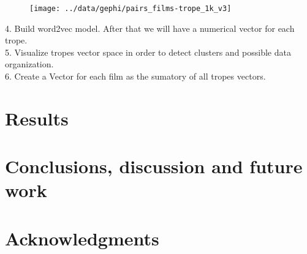 \documentclass[letterpaper]{article}
\begin{document}

      
	\begin{figure}
		\centering
		\texttt{[image: ../data/gephi/pairs\_films-trope\_1k\_v3]}
		\caption{}
		\label{fig:pairsfilms-trope1kv3}
	\end{figure}

	4. Build word2vec model. After that we will have a numerical vector for each trope. \\
	5. Visualize tropes vector space in order to detect clusters and possible data organization. \\ 
	6. Create a Vector for each film as the sumatory of all tropes vectors. \\

        \section{Results}
        \label{sec:res}
        
        \section{Conclusions, discussion and future work}
        
	\section{Acknowledgments}
	
	
	
	
\end{document}

